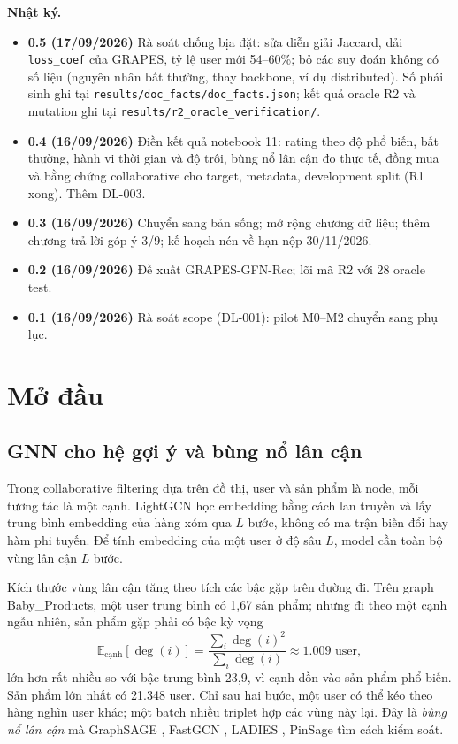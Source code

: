 \documentclass[11pt,a4paper,oneside]{report}
\begin{document}
\noindent\textbf{Nhật ký.}
\begin{itemize}
\item \textbf{0.5 (17/09/2026)} Rà soát chống bịa đặt: sửa diễn giải Jaccard, dải \texttt{loss\_coef} của GRAPES, tỷ lệ user mới 54--60\%; bỏ các suy đoán không có số liệu (nguyên nhân bất thường, thay backbone, ví dụ distributed). Số phái sinh ghi tại \texttt{results/doc\_facts/doc\_facts.json}; kết quả oracle R2 và mutation ghi tại \texttt{results/r2\_oracle\_verification/}.
\item \textbf{0.4 (16/09/2026)} Điền kết quả notebook 11: rating theo độ phổ biến, bất thường, hành vi thời gian và độ trôi, bùng nổ lân cận đo thực tế, đồng mua và bằng chứng collaborative cho target, metadata, development split (R1 xong). Thêm DL-003.
\item \textbf{0.3 (16/09/2026)} Chuyển sang bản sống; mở rộng chương dữ liệu; thêm chương trả lời góp ý 3/9; kế hoạch nén về hạn nộp 30/11/2026.
\item \textbf{0.2 (16/09/2026)} Đề xuất GRAPES-GFN-Rec; lõi mã R2 với 28 oracle test.
\item \textbf{0.1 (16/09/2026)} Rà soát scope (DL-001): pilot M0--M2 chuyển sang phụ lục.
\end{itemize}

\chapter{Mở đầu}

\section{GNN cho hệ gợi ý và bùng nổ lân cận}
Trong collaborative filtering dựa trên đồ thị, user và sản phẩm là node, mỗi tương tác là một cạnh. LightGCN \cite{lightgcn} học embedding bằng cách lan truyền và lấy trung bình embedding của hàng xóm qua $L$ bước, không có ma trận biến đổi hay hàm phi tuyến. Để tính embedding của một user ở độ sâu $L$, model cần toàn bộ vùng lân cận $L$ bước.

Kích thước vùng lân cận tăng theo tích các bậc gặp trên đường đi. Trên graph Baby\_Products, một user trung bình có 1,67 sản phẩm; nhưng đi theo một cạnh ngẫu nhiên, sản phẩm gặp phải có bậc kỳ vọng
\[
  \mathbb{E}_{\text{cạnh}}[\deg(i)] = \frac{\sum_i \deg(i)^2}{\sum_i \deg(i)} \approx 1.009 \text{ user},
\]
lớn hơn rất nhiều so với bậc trung bình 23,9, vì cạnh dồn vào sản phẩm phổ biến. Sản phẩm lớn nhất có 21.348 user. Chỉ sau hai bước, một user có thể kéo theo hàng nghìn user khác; một batch nhiều triplet hợp các vùng này lại. Đây là \emph{bùng nổ lân cận} mà GraphSAGE \cite{graphsage}, FastGCN \cite{fastgcn}, LADIES \cite{ladies}, PinSage \cite{pinsage} tìm cách kiểm soát.
\end{document}
